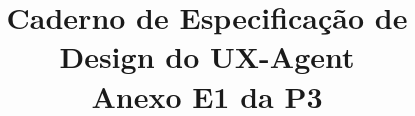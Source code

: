 \documentclass[conference,a4paper]{IEEEtran}
\title{Caderno de Especificação de Design do UX-Agent\\Anexo E1 da P3}
\begin{document}
\maketitle

\appendices



\end{document}
